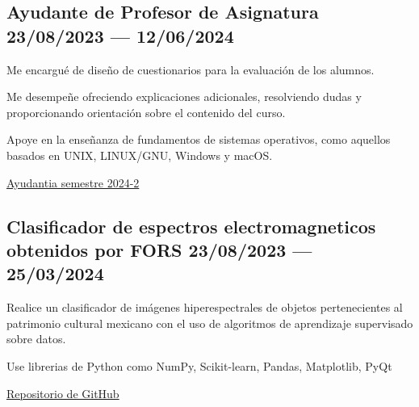 
\subsection{{Ayudante de Profesor  de Asignatura  \hfill 23/08/2023 --- 12/06/2024}}
\begin{zitemize}
\item Me encargué de diseño de cuestionarios para la evaluación de los alumnos. 
\item Me desempeñe ofreciendo explicaciones adicionales, resolviendo dudas y proporcionando orientación sobre el contenido del curso.

\item Apoye en la enseñanza de fundamentos de sistemas operativos, como aquellos basados en UNIX, LINUX/GNU, Windows y macOS.

\item \href{https://archive.fciencias.unam.mx/directorio/103019}{Ayudantia semestre 2024-2}
\end{zitemize}


\subsection{{Clasificador de espectros electromagneticos obtenidos por FORS  \hfill 23/08/2023 --- 25/03/2024}}
\begin{zitemize}
\item Realice un clasificador de imágenes hiperespectrales de objetos pertenecientes al patrimonio cultural mexicano con el uso de algoritmos de aprendizaje supervisado sobre datos.

\item Use librerias de Python como NumPy, Scikit-learn, Pandas, Matplotlib, PyQt

\item \href{https://github.com/NataliaPerez08/servicio-social.git}{Repositorio de GitHub}
\end{zitemize}






